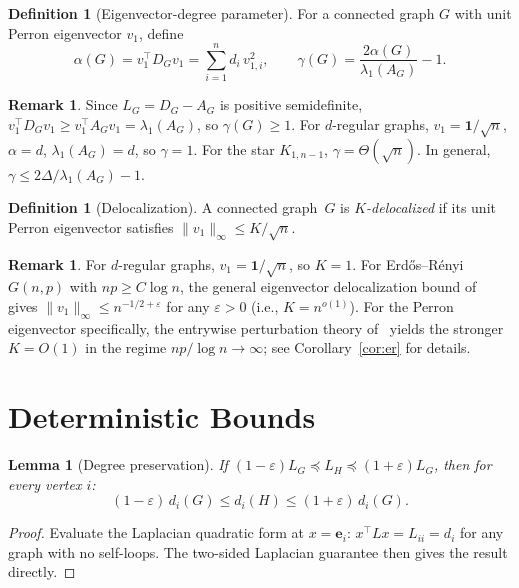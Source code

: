 \documentclass[11pt]{article}
\newtheorem{lemma}[theorem]{Lemma}
\theoremstyle{definition}
\newtheorem{definition}[theorem]{Definition}
\newtheorem{remark}[theorem]{Remark}
\newcommand{\eps}{\varepsilon}
\newcommand{\lamG}{\lambda_1(A_G)}
\newcommand{\AG}{A_G}
\newcommand{\LG}{L_G}
\newcommand{\LH}{L_H}
\newcommand{\be}{\mathbf{e}}
\newcommand{\vone}{v_1}
\begin{document}
\begin{definition}[Eigenvector-degree parameter]\label{def:gamma}
For a connected graph $G$ with unit Perron eigenvector $\vone$, define
\[
\alpha(G) = \vone^\top D_G \vone = \sum_{i=1}^n d_i \, v_{1,i}^2,
\qquad
\gamma(G) = \frac{2\alpha(G)}{\lamG} - 1.
\]
\end{definition}

\begin{remark}\label{rem:gamma-bounds}
Since $\LG = D_G - \AG$ is positive semidefinite, $\vone^\top D_G \vone \geq
\vone^\top \AG \vone = \lamG$, so $\gamma(G) \geq 1$. For $d$-regular graphs,
$\vone = \mathbf{1}/\sqrt{n}$, $\alpha = d$, $\lamG = d$, so $\gamma = 1$.
For the star $K_{1,n-1}$, $\gamma = \Theta(\sqrt{n})$.
In general, $\gamma \leq 2\Delta/\lamG - 1$.
\end{remark}

\begin{definition}[Delocalization]\label{def:deloc}
A connected graph~$G$ is \emph{$K$-delocalized} if its unit Perron eigenvector satisfies
$\|\vone\|_\infty \leq K / \sqrt{n}$.
\end{definition}

\begin{remark}
For $d$-regular graphs, $\vone = \mathbf{1}/\sqrt{n}$, so $K = 1$.
For Erd\H{o}s--R\'{e}nyi $G(n,p)$ with $np \geq C\log n$,
the general eigenvector delocalization bound of~\citet{he2019eigenvectors}
gives $\|\vone\|_\infty \leq n^{-1/2+\eps}$ for any $\eps > 0$ (i.e.,
$K = n^{o(1)}$). For the Perron eigenvector specifically, the entrywise
perturbation theory of~\citet{abbe2020entrywise} yields the stronger
$K = O(1)$ in the regime $np/\log n \to \infty$; see
Corollary~\ref{cor:er} for details.
\end{remark}


\section{Deterministic Bounds}\label{sec:deterministic}

\begin{lemma}[Degree preservation]\label{lem:degree}
If $(1-\eps)\LG \preceq \LH \preceq (1+\eps)\LG$, then for every vertex $i$:
\[
(1-\eps)\, d_i(G) \leq d_i(H) \leq (1+\eps)\, d_i(G).
\]
\end{lemma}
\begin{proof}
Evaluate the Laplacian quadratic form at $x = \be_i$:
$x^\top L x = L_{ii} = d_i$ for any graph with no self-loops.
The two-sided Laplacian guarantee then gives the result directly.
\end{proof}
\end{document}
